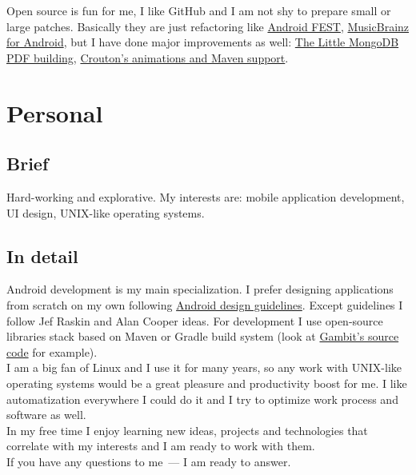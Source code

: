       Open source is fun for me, I like GitHub and I am not shy to prepare
      small or large patches. Basically they are just refactoring like
      \href{https://github.com/square/fest-android/commits?author=ming13}{Android FEST},
      \href{https://github.com/jdamcd/musicbrainz-android/commits?author=ming13}{MusicBrainz for Android},
      but I have done major improvements as well:
      \href{https://github.com/karlseguin/the-little-mongodb-book/pull/16}{The Little MongoDB PDF building},
      \href{https://github.com/keyboardsurfer/Crouton/pulls/ming13?state=closed}{Crouton’s animations and Maven support}.


  \section*{Personal}

    \subsection*{Brief}

      Hard-working and explorative. My interests are:
      mobile application development, UI design, UNIX-like
      operating systems.

    \subsection*{In detail}

      Android development is my main specialization. I prefer designing
      applications from scratch on my own following
      \href{https://developer.android.com/design/}{Android design guidelines}.
      Except guidelines I follow Jef Raskin
      and Alan Cooper ideas. For development I use open-source libraries
      stack based on Maven or Gradle build system (look at
      \href{https://github.com/ming13/gambit}{Gambit’s source code} for example). \\

      I am a big fan of Linux and I use it for many years,
      so any work with UNIX-like operating systems
      would be a great pleasure and productivity boost for me.
      I like automatization everywhere I could do it and I try to optimize
      work process and software as well. \\

      In my free time I enjoy learning new ideas, projects and technologies
      that correlate with my interests and I am ready to work with them. \\

      If you have any questions to me~--- I am ready to answer.

  \vfill


